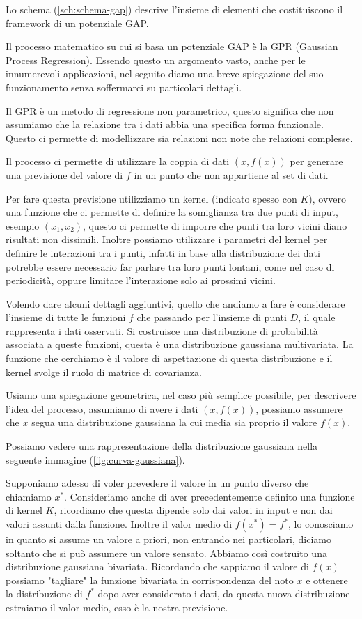 \documentclass[a4paper,11pt,openany]{book}
\begin{document}
Lo schema (\ref{sch:schema-gap}) descrive l'insieme di elementi che costituiscono il framework di un potenziale GAP.

Il processo matematico su cui si basa un potenziale GAP è la GPR (Gaussian Process Regression). 
Essendo questo un argomento vasto, anche per le innumerevoli applicazioni, nel seguito diamo una breve spiegazione del suo funzionamento senza soffermarci su particolari dettagli.

Il GPR è un metodo di regressione non parametrico, questo significa che non assumiamo che la relazione tra i dati abbia una specifica forma funzionale.
Questo ci permette di modellizzare sia relazioni non note che relazioni complesse.

Il processo ci permette di utilizzare la coppia di dati $(x, f(x))$ per generare una previsione del valore di $f$ in un punto che non appartiene al set di dati.

Per fare questa previsione utilizziamo un kernel (indicato spesso con $K$), ovvero una funzione che ci permette di definire la somiglianza tra due punti di input, esempio $(x_1, x_2)$, questo ci permette di imporre che punti tra loro vicini diano risultati non dissimili.
Inoltre possiamo utilizzare i parametri del kernel per definire le interazioni tra i punti, infatti in base alla distribuzione dei dati potrebbe essere necessario far parlare tra loro punti lontani, come nel caso di periodicità, oppure limitare l'interazione solo ai prossimi vicini.


Volendo dare alcuni dettagli aggiuntivi, quello che andiamo a fare è considerare l'insieme di tutte le funzioni $f$ che passando per l'insieme di punti $D$, il quale rappresenta i dati osservati.
Si costruisce una distribuzione di probabilità associata a queste funzioni, questa è una distribuzione gaussiana multivariata.
La funzione che cerchiamo è il valore di aspettazione di questa distribuzione e il kernel svolge il ruolo di matrice di covarianza.

Usiamo una spiegazione geometrica, nel caso più semplice possibile, per descrivere l'idea del processo, assumiamo di avere i dati $(x, f(x))$, possiamo assumere che $x$ segua una distribuzione gaussiana la cui media sia proprio il valore $f(x)$.

Possiamo vedere una rappresentazione della distribuzione gaussiana nella seguente immagine (\ref{fig:curva-gaussiana}).


Supponiamo adesso di voler prevedere il valore in un punto diverso che chiamiamo $x^*$. 
Consideriamo anche di aver precedentemente definito una funzione di kernel $K$, ricordiamo che questa dipende solo dai valori in input e non dai valori assunti dalla funzione.
Inoltre il valor medio di $f(x^*) = f^*$, lo conosciamo in quanto si assume un valore a priori, non entrando nei particolari, diciamo soltanto che si può assumere un valore sensato.
Abbiamo così costruito una distribuzione gaussiana bivariata.
Ricordando che sappiamo il valore di $f(x)$ possiamo "tagliare" la funzione bivariata in corrispondenza del noto $x$ e ottenere la distribuzione di $f^*$ dopo aver considerato i dati, da questa nuova distribuzione estraiamo il valor medio, esso è la nostra previsione.
\end{document}
